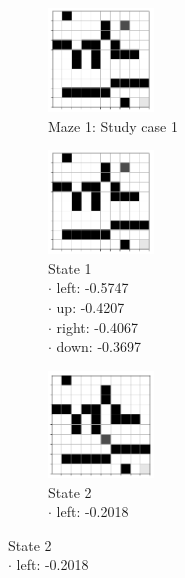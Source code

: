 \documentclass[a4paper]{article}    %
\begin{document}
\begin{figure}[H]
    \centering
    \begin{subfigure}{0.24\textwidth}
        \centering
        \includegraphics[width=2.8cm]{maze2-case1-state1}
        \caption{Maze 1: Study case 1 \vspace{12mm}}
        \label{fig:maze2-case1-states}
    \end{subfigure}
    \hfill
    \centering
    \begin{subfigure}{0.24\textwidth}
        \centering
        \includegraphics[width=2.8cm]{maze2-case1-state1}
        \caption{State 1 \\
            \scriptsize
            \hspace*{5mm} $\boldsymbol{\cdot}$ left:  -0.5747 \\
            \hspace*{5mm} $\boldsymbol{\cdot}$ up:    -0.4207 \\
            \hspace*{5mm} $\boldsymbol{\cdot}$ right: -0.4067 \\
            \hspace*{5mm} $\boldsymbol{\cdot}$ down:  -0.3697 }
        \label{fig:maze2-case1-state1}
    \end{subfigure}
    \hfill
    \begin{subfigure}{0.24\textwidth}
        \centering
        \includegraphics[width=2.8cm]{maze2-case1-state2}
        \caption{State 2 \\
            \scriptsize
            \hspace*{5mm} $\boldsymbol{\cdot}$ left:  -0.2018 \\
}
\end{subfigure}
\end{figure}
\end{document}
